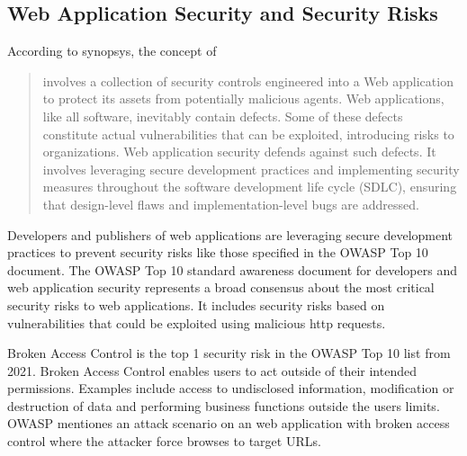 \subsection{Web Application Security and Security Risks}
According to synopsys, the concept of 
\begin{quote}
	involves a collection of security controls engineered into a Web application to protect its assets from potentially malicious agents. Web applications, like all software, inevitably contain defects. Some of these defects constitute actual vulnerabilities that can be exploited, introducing risks to organizations. Web application security defends against such defects. It involves leveraging secure development practices and implementing security measures throughout the software development life cycle (SDLC), ensuring that design-level flaws and implementation-level bugs are addressed.
\end{quote}
Developers and publishers of web applications are leveraging secure development practices to prevent security risks like those specified in the OWASP Top 10 document.
The OWASP Top 10 standard awareness document for developers and web application security represents a broad consensus about the most critical security risks to web applications.
It includes security risks based on vulnerabilities that could be exploited using malicious \acrshort{http} requests.
\cite{OWASP/Top10}

Broken Access Control is the top 1 security risk in the OWASP Top 10 list from 2021.
Broken Access Control enables users to act outside of their intended permissions.
Examples include access to undisclosed information, modification or destruction of data and performing business functions outside the users limits.
OWASP mentiones an attack scenario on an web application with broken access control where the attacker force browses to target URLs. \cite{OWASP/BrokenAccessControl,OWASP/Risks2021} 

